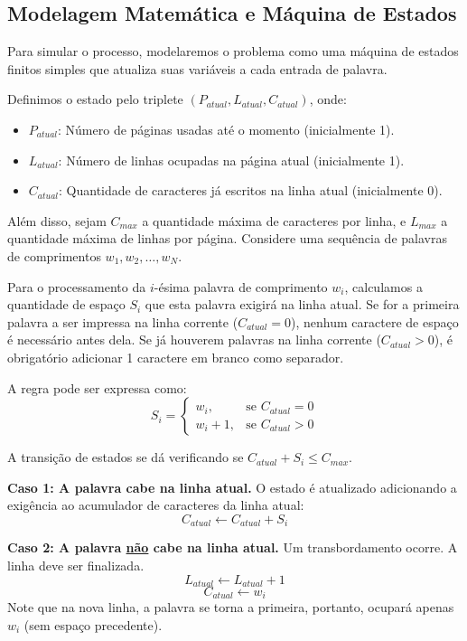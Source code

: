 \documentclass[11pt]{article}
\begin{document}
\subsection{Modelagem Matemática e Máquina de Estados}

Para simular o processo, modelaremos o problema como uma máquina de estados finitos simples que atualiza suas variáveis a cada entrada de palavra.

Definimos o estado pelo triplete $(P_{atual}, L_{atual}, C_{atual})$, onde:
\begin{itemize}
    \item $P_{atual}$: Número de páginas usadas até o momento (inicialmente 1).
    \item $L_{atual}$: Número de linhas ocupadas na página atual (inicialmente 1).
    \item $C_{atual}$: Quantidade de caracteres já escritos na linha atual (inicialmente 0).
\end{itemize}

Além disso, sejam $C_{max}$ a quantidade máxima de caracteres por linha, e $L_{max}$ a quantidade máxima de linhas por página. Considere uma sequência de palavras de comprimentos $w_1, w_2, \ldots, w_N$.

Para o processamento da $i$-ésima palavra de comprimento $w_i$, calculamos a quantidade de espaço $S_i$ que esta palavra exigirá na linha atual.
Se for a primeira palavra a ser impressa na linha corrente ($C_{atual} = 0$), nenhum caractere de espaço é necessário antes dela. Se já houverem palavras na linha corrente ($C_{atual} > 0$), é obrigatório adicionar 1 caractere em branco como separador. 

A regra pode ser expressa como:
$$
S_i = \begin{cases} 
w_i, & \text{se } C_{atual} = 0 \\
w_i + 1, & \text{se } C_{atual} > 0 
\end{cases}
$$

A transição de estados se dá verificando se $C_{atual} + S_i \leq C_{max}$.

\textbf{Caso 1: A palavra cabe na linha atual.}
O estado é atualizado adicionando a exigência ao acumulador de caracteres da linha atual:
$$C_{atual} \leftarrow C_{atual} + S_i$$

\textbf{Caso 2: A palavra \underline{não} cabe na linha atual.}
Um transbordamento ocorre. A linha deve ser finalizada.
$$L_{atual} \leftarrow L_{atual} + 1$$
$$C_{atual} \leftarrow w_i$$
Note que na nova linha, a palavra se torna a primeira, portanto, ocupará apenas $w_i$ (sem espaço precedente).
\end{document}

